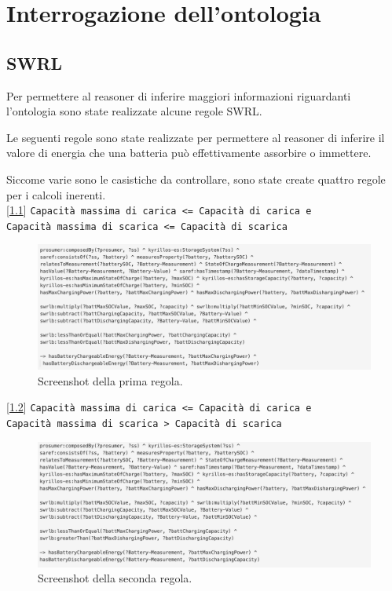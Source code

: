 \chapter{Interrogazione dell'ontologia}

\section{SWRL}
Per permettere al reasoner di inferire maggiori informazioni riguardanti l'ontologia sono state realizzate alcune regole SWRL.

Le seguenti regole sono state realizzate per permettere al reasoner di inferire il valore di energia che una batteria può effettivamente assorbire o immettere.

Siccome varie sono le casistiche da controllare, sono state create quattro regole per i calcoli inerenti.\\


[\ref*{fig:bothlessorequal}] \texttt{Capacità massima di carica <= Capacità di carica e\\
    Capacità massima di scarica <= Capacità di scarica}

\begin{figure}[H]
    \centering
    \includegraphics[width=15cm]{images/both <=.png}
    \caption{Screenshot della prima regola.}
    \label{fig:bothlessorequal}
\end{figure}

[\ref*{fig:charginglessorequal}] \texttt{Capacità massima di carica <= Capacità di carica e\\ Capacità massima di scarica > Capacità di scarica}

\begin{figure}[H]
    \centering
    \includegraphics[width=15cm]{images/charging <=.png}
    \caption{Screenshot della seconda regola.}
    \label{fig:charginglessorequal}
\end{figure}

